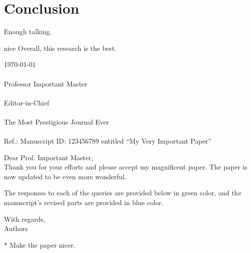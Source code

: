 \documentclass[journal]{IEEEtran}
\def\thetitle{My Very Important Paper}
\begin{document}
\section{Conclusion}
Enough talking.
\begin{rev}{nice}
Overall, this research is the best.
\lipsum[6]
\end{rev}





\begin{responseletter}

\begin{coverletter}

\today \\~\\
Professor Important Master \\~\\
Editor-in-Chief \\~\\
The Most Prestigious Journal Ever \\~\\
Ref.: Manuscript ID: 123456789 entitled ``\thetitle''

\vspace{1cm}

Dear Prof. Important Master,\\

Thank you for your efforts and please accept my magnificent paper.
\lipsum[1]
The paper is now updated to be even more wonderful.

\vspace{1cm}

The responses to each of the queries are provided below in {\revresponsecolor{}green color}, and the manuscript's revised parts are provided in {\revcolor{}blue color}.

\vspace{1cm}

With regards, \\
Authors

\end{coverletter}


\begin{revcomment}*
  Make the paper nicer. \lipsum[1]


\end{revcomment}
\end{responseletter}
\end{document}
